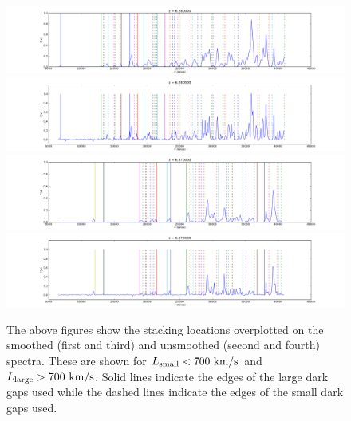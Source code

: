 \documentclass[11pt]{article}
\begin{document}
\begin{figure}[h]
  \centering
  \includegraphics[width=18cm]{sflux_panel1.png}
  \includegraphics[width=18cm]{flux_panel1.png}
  \includegraphics[width=18cm]{sflux_panel2.png}
  \includegraphics[width=18cm]{flux_panel2.png}
  \caption{The above figures show the stacking locations overplotted on the smoothed (first and third) and unsmoothed (second and fourth) spectra. These are shown for $L_{\text{small}} < 700\ \text{km}/\text{s}$ and $L_{\text{large}} > 700\ \text{km}/\text{s}$. Solid lines indicate the edges of the large dark gaps used while the dashed lines indicate the edges of the small dark gaps used. }
  \label{fig:panel12}
\end{figure}
\end{document}
